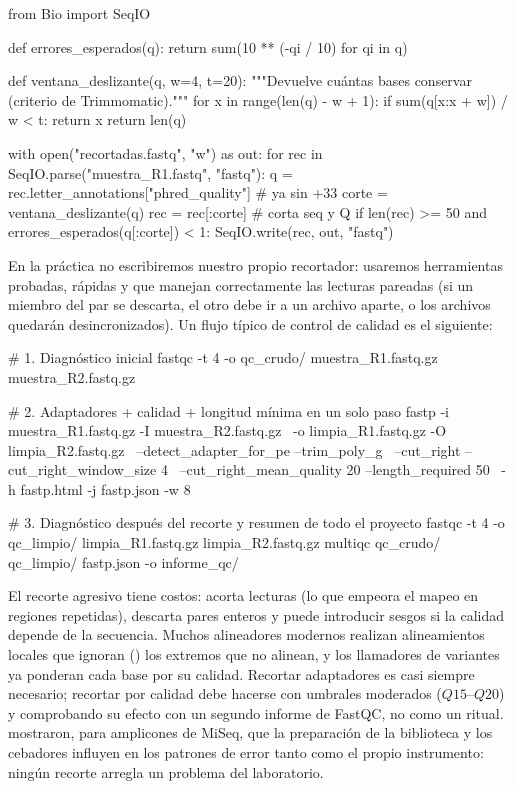 \begin{codigo}[recorte.py]
from Bio import SeqIO

def errores_esperados(q):
    return sum(10 ** (-qi / 10) for qi in q)

def ventana_deslizante(q, w=4, t=20):
    """Devuelve cuántas bases conservar (criterio de Trimmomatic)."""
    for x in range(len(q) - w + 1):
        if sum(q[x:x + w]) / w < t:
            return x
    return len(q)

with open("recortadas.fastq", "w") as out:
    for rec in SeqIO.parse("muestra_R1.fastq", "fastq"):
        q = rec.letter_annotations["phred_quality"]      # ya sin +33
        corte = ventana_deslizante(q)
        rec = rec[:corte]                                # corta seq y Q
        if len(rec) >= 50 and errores_esperados(q[:corte]) < 1:
            SeqIO.write(rec, out, "fastq")
\end{codigo}

En la práctica no escribiremos nuestro propio recortador: usaremos herramientas probadas, rápidas y que manejan correctamente las lecturas pareadas (si un miembro del par se descarta, el otro debe ir a un archivo aparte, o los archivos quedarán desincronizados). Un flujo típico de control de calidad es el siguiente:

\begin{consola}
# 1. Diagnóstico inicial
fastqc -t 4 -o qc_crudo/ muestra_R1.fastq.gz muestra_R2.fastq.gz

# 2. Adaptadores + calidad + longitud mínima en un solo paso
fastp -i muestra_R1.fastq.gz -I muestra_R2.fastq.gz \
      -o limpia_R1.fastq.gz  -O limpia_R2.fastq.gz  \
      --detect_adapter_for_pe --trim_poly_g         \
      --cut_right --cut_right_window_size 4         \
      --cut_right_mean_quality 20 --length_required 50 \
      -h fastp.html -j fastp.json -w 8

# 3. Diagnóstico después del recorte y resumen de todo el proyecto
fastqc -t 4 -o qc_limpio/ limpia_R1.fastq.gz limpia_R2.fastq.gz
multiqc qc_crudo/ qc_limpio/ fastp.json -o informe_qc/
\end{consola}

\begin{cuidado}[No recorte por reflejo]
El recorte agresivo tiene costos: acorta lecturas (lo que empeora el mapeo en regiones repetidas), descarta pares enteros y puede introducir sesgos si la calidad depende de la secuencia. Muchos alineadores modernos realizan alineamientos locales que ignoran () los extremos que no alinean, y los llamadores de variantes ya ponderan cada base por su calidad. Recortar adaptadores es casi siempre necesario; recortar por calidad debe hacerse con umbrales moderados ($Q15$--$Q20$) y comprobando su efecto con un segundo informe de FastQC, no como un ritual. \textcite{c06-schirmer2015} mostraron, para amplicones de MiSeq, que la preparación de la biblioteca y los cebadores influyen en los patrones de error tanto como el propio instrumento: ningún recorte arregla un problema del laboratorio.
\end{cuidado}

